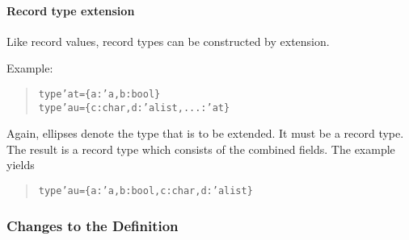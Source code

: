 \documentclass[twoside,titlepage]{article}
\newcommand{\void}[1]{}
\begin{document}
\begin{appendix}
\paragraph{Record type extension}

Like record values, record types can be constructed by extension.

Example:
\begin{quote}
\begin{alltt}
type 'a t = \{a : 'a, b : bool\}
type 'a u = \{c : char, d : 'a list, ... : 'a t\}
\end{alltt}
\end{quote}
Again, ellipses denote the type that is to be extended. It must be a record type. The result is a record type which consists of the combined fields. The example yields
\begin{quote}
\begin{alltt}
type 'a u = \{a : 'a, b : bool, c : char, d : 'a list\}
\end{alltt}
\end{quote}

\void{
\paragraph{Functional record update}

Functional record update can be expressed by a combination of row capture and record extension, as can be observed in the following example:

\begin{quote}
\begin{alltt}
let val r = \{a = 1, c = 3.0, d = "not a list", f = [1], p = ["not a string"], z = NONE\}
in \{r where d = nil, p = "hello"\}
end
\end{alltt}
\end{quote}
can be rewritten as:
\begin{quote}
\begin{alltt}
let val r = \{a = 1, c = 3.0, d = "not a list", f = [1], p = ["not a string"], z = NONE\}
    val \{d = _, p = _, ... = tmp\} = r
in \{... = tmp, d = nil, p = "hello"\}
end
\end{alltt}
\end{quote}
where {\tt tmp} is a fresh variable.
}

\subsubsection*{Changes to the Definition}


\end{appendix}
\end{document}
